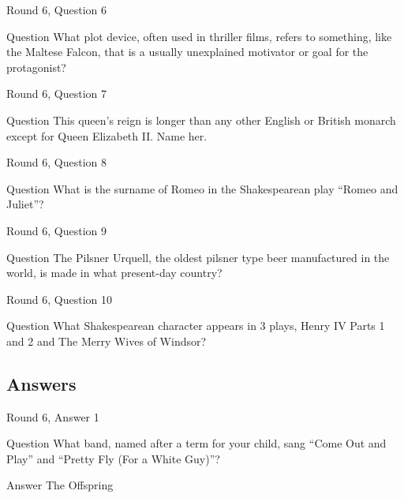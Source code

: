 \documentclass[11pt]{beamer}
\begin{document}
\begin{frame}{Round 6, Question 6}
\begin{block}{Question}
What plot device, often used in thriller films, refers to something, like the Maltese Falcon, that is a usually unexplained motivator or goal for the protagonist\@?
\end{block}
\end{frame}
    

\begin{frame}{Round 6, Question 7}
\begin{block}{Question}
This queen's reign is longer than any other English or British monarch except for Queen Elizabeth II. Name her.
\end{block}
\end{frame}
    

\begin{frame}{Round 6, Question 8}
\begin{block}{Question}
What is the surname of Romeo in the Shakespearean play ``Romeo and Juliet''\@?
\end{block}
\end{frame}
    

\begin{frame}{Round 6, Question 9}
\begin{block}{Question}
The Pilsner Urquell, the oldest pilsner type beer manufactured in the world, is made in what present-day country\@?
\end{block}
\end{frame}
    

\begin{frame}{Round 6, Question 10}
\begin{block}{Question}
What Shakespearean character appears in 3 plays, Henry IV Parts 1 and 2 and The Merry Wives of Windsor\@?
\end{block}
\end{frame}
    
\subsection{Answers}

\begin{frame}{Round 6, Answer 1}
\begin{block}{Question}
What band, named after a term for your child, sang ``Come Out and Play'' and ``Pretty Fly (For a White Guy)''\@?
\end{block}
\pause{}
\begin{block}{Answer}
The Offspring
\end{block}
\end{frame}
    
\end{document}
